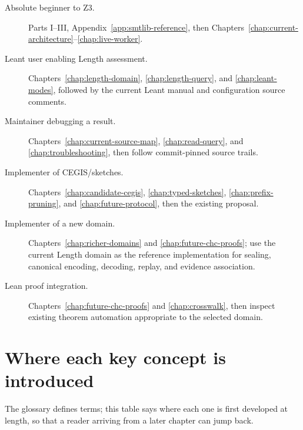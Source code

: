 \documentclass[10pt,letterpaper,oneside]{report}
\begin{document}
\begin{description}
\item[Absolute beginner to Z3.] Parts I--III, Appendix~\ref{app:smtlib-reference}, then Chapters~\ref{chap:current-architecture}--\ref{chap:live-worker}.

\item[Leant user enabling Length assessment.] Chapters~\ref{chap:length-domain}, \ref{chap:length-query}, and \ref{chap:leant-modes}, followed by the current Leant manual and configuration source comments.

\item[Maintainer debugging a result.] Chapters~\ref{chap:current-source-map}, \ref{chap:read-query}, and \ref{chap:troubleshooting}, then follow commit-pinned source trails.

\item[Implementer of CEGIS/sketches.] Chapters~\ref{chap:candidate-cegis}, \ref{chap:typed-sketches}, \ref{chap:prefix-pruning}, and \ref{chap:future-protocol}, then the existing proposal.

\item[Implementer of a new domain.] Chapters~\ref{chap:richer-domains} and \ref{chap:future-chc-proofs}; use the current Length domain as the reference implementation for sealing, canonical encoding, decoding, replay, and evidence association.

\item[Lean proof integration.] Chapters~\ref{chap:future-chc-proofs} and \ref{chap:crosswalk}, then inspect existing theorem automation appropriate to the selected domain.
\end{description}

\section{Where each key concept is introduced}

The glossary defines terms; this table says where each one is first developed at length, so that a reader arriving from a later chapter can jump back.
\end{document}
